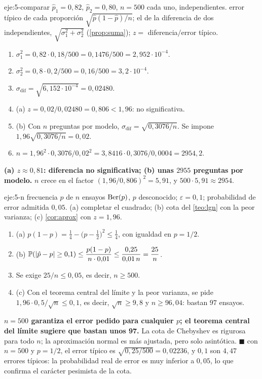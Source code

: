 \begin{solucion}{eje:5-comparar}
\datos $\hat p_1=0{,}82$, $\hat p_2=0{,}80$, $n=500$ cada uno, independientes.
\planteamiento error típico de cada proporción $\sqrt{\hat p(1-\hat p)/n}$; el de la diferencia de dos independientes, $\sqrt{\sigma_1^{2}+\sigma_2^{2}}$ (\cref{prop:suma}); $z=$ diferencia$/$error típico.
\pasos
\begin{enumerate}[label=\arabic*.]
  \item $\sigma_1^{2}=0{,}82\cdot 0{,}18/500=0{,}1476/500=2{,}952\cdot 10^{-4}$.
  \item $\sigma_2^{2}=0{,}8\cdot 0{,}2/500=0{,}16/500=3{,}2\cdot 10^{-4}$.
  \item $\sigma_{\mathrm{dif}}=\sqrt{6{,}152\cdot 10^{-4}}=0{,}02480$.
  \item (a) $z=0{,}02/0{,}02480=0{,}806<1{,}96$: no significativa.
  \item (b) Con $n$ preguntas por modelo, $\sigma_{\mathrm{dif}}=\sqrt{0{,}3076/n}$. Se impone $1{,}96\sqrt{0{,}3076/n}=0{,}02$.
  \item $n=1{,}96^{2}\cdot 0{,}3076/0{,}02^{2}=3{,}8416\cdot 0{,}3076/0{,}0004=2954{,}2$.
\end{enumerate}
\resultado \textbf{(a) $z\approx 0{,}81$: diferencia no significativa; (b) unas $2955$ preguntas por modelo.}
\comprobacion $n$ crece en el factor $(1{,}96/0{,}806)^{2}=5{,}91$, y $500\cdot 5{,}91\approx 2954$.
\end{solucion}

\begin{solucion}{eje:5-n}
\datos frecuencia $\hat p$ de $n$ ensayos $\operatorname{Ber}(p)$, $p$ desconocido; $\varepsilon=0{,}1$; probabilidad de error admitida $0{,}05$.
\planteamiento (a) completar el cuadrado; (b) cota del \cref{teo:lgn} con la peor varianza; (c) \cref{cor:aprox} con $z=1{,}96$.
\pasos
\begin{enumerate}[label=\arabic*.]
  \item (a) $p(1-p)=\frac14-\bigl(p-\frac12\bigr)^{2}\le\frac14$, con igualdad en $p=1/2$.
  \item (b) $\mathbb{P}(\lvert\hat p-p\rvert\ge 0{,}1)\le\dfrac{p(1-p)}{n\cdot 0{,}01}\le\dfrac{0{,}25}{0{,}01\,n}=\dfrac{25}{n}$.
  \item Se exige $25/n\le 0{,}05$, es decir, $n\ge 500$.
  \item (c) Con el teorema central del límite y la peor varianza, se pide $1{,}96\cdot 0{,}5/\sqrt n\le 0{,}1$, es decir, $\sqrt n\ge 9{,}8$ y $n\ge 96{,}04$: bastan $97$ ensayos.
\end{enumerate}
\resultado \textbf{$n=500$ garantiza el error pedido para cualquier $p$; el teorema central del límite sugiere que bastan unos 97.} La cota de Chebyshev es rigurosa para todo $n$; la aproximación normal es más ajustada, pero solo asintótica. $\blacksquare$
\comprobacion con $n=500$ y $p=1/2$, el error típico es $\sqrt{0{,}25/500}=0{,}02236$, y $0{,}1$ son $4{,}47$ errores típicos: la probabilidad real de error es muy inferior a $0{,}05$, lo que confirma el carácter pesimista de la cota.
\end{solucion}
